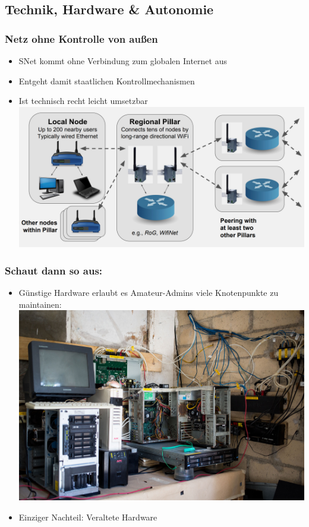 \subsection{Technik, Hardware \& Autonomie}

\begin{frame}
\frametitle{Netz ohne Kontrolle von außen}
	\begin{itemize}
		\item SNet kommt ohne Verbindung zum globalen Internet aus
		\item Entgeht damit staatlichen Kontrollmechanismen
		\item Ist technisch recht leicht umsetzbar
			\includegraphics[width=\textwidth]{images/snet_tech.jpg}
	\end{itemize}
	
\end{frame}
		
\begin{frame}
\frametitle{Schaut dann so aus:}
	\begin{itemize}
		\item Günstige Hardware erlaubt es Amateur-Admins viele Knotenpunkte zu maintainen:
			\includegraphics[width=\textwidth]{images/snet_pillar.jpg}
		\item Einziger Nachteil: Veraltete Hardware
	\end{itemize}
\end{frame}

